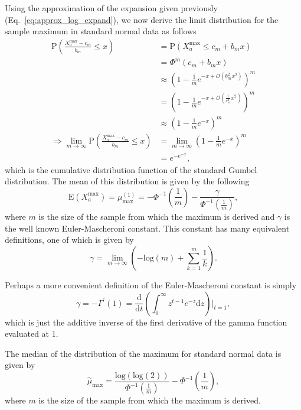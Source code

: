 \documentclass[aos]{imsart}
\begin{document}
Using the approximation of the expansion given previously (Eq.~\ref{eq:approx_log_expand}), we now derive the limit distribution for the sample maximum in standard normal data as follows
%
\begin{equation}\label{eq:prob_normal_max}
\begin{aligned}
\text{P}\left(\frac{X^\text{max}_a - c_m}{b_m} \leq x\right) &= \text{P}(X^\text{max}_a \leq c_m + b_m x) \\
&= \Phi^m(c_m + b_m x) \\
&\approx \left(1 - \frac{1}{m}e^{-x + \mathcal{O}(b^2_m x^2)}\right)^m \\
&= \left(1 - \frac{1}{m}e^{-x + \mathcal{O}\left(\frac{1}{c^2_m} x^2\right)}\right)^m \\
&\approx \left(1 - \frac{1}{m}e^{-x}\right)^m \\
\Rightarrow \lim_{m \to \infty} \text{P}\left(\frac{X^\text{max}_a - c_m}{b_m} \leq x\right) &= \lim_{m \to \infty} \left(1 - \frac{1}{m}e^{-x}\right)^m \\
&= e^{-e^{-x}},
\end{aligned}
\end{equation}
%
which is the cumulative distribution function of the standard Gumbel distribution. The mean of this distribution is given by the following
%
\begin{equation}\label{eq:mu_max_normal}
\text{E}(X^\text{max}_a) = \mu^{(1)}_\text{max} = -\Phi^{-1} \left(\frac{1}{m}\right) - \frac{\gamma}{\Phi^{-1}\left(\frac{1}{m}\right)},
\end{equation}
%
where $m$ is the size of the sample from which the maximum is derived and $\gamma$ is the well known Euler-Mascheroni constant. This constant has many equivalent definitions, one of which is given by
%
\[
\gamma = \lim_{m \to \infty} \left(-\text{log}(m) + \sum^{m}_{k=1}\frac{1}{k}\right).
\]

Perhaps a more convenient definition of the Euler-Mascheroni constant is simply
%
\[
\gamma = - \Gamma^\prime (1) = \frac{\text{d}}{\text{d}t} \left(\int^{\infty}_{0} z^{t-1} e^{-z} \text{d}z\right) \biggr|_{t=1},
\]
%
which is just the additive inverse of the first derivative of the gamma function evaluated at 1.

The median of the distribution of the maximum for standard normal data is given by
%
\begin{equation}\label{eq:med_max_normal}
\overset{\sim}{\mu}_\text{max} = \frac{\text{log}(\text{log}(2))}{\Phi^{-1}\left(\frac{1}{m}\right)} - \Phi^{-1}\left(\frac{1}{m}\right),
\end{equation}
%
where $m$ is the size of the sample from which the maximum is derived.
\end{document}
